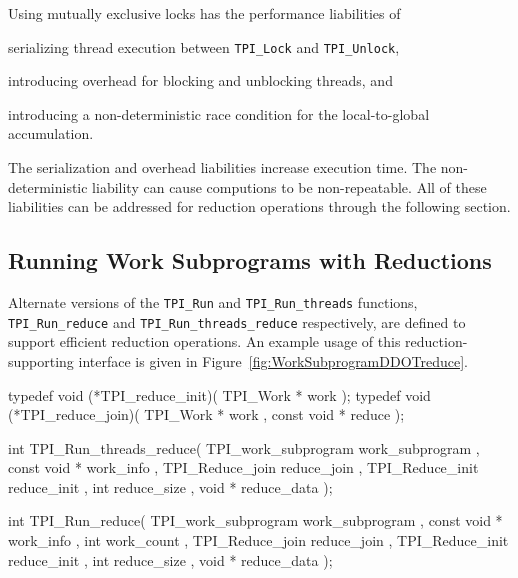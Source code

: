 Using mutually exclusive locks has the performance liabilities of 
\begin{blist}
\item serializing thread execution between \texttt{TPI\_Lock} and \texttt{TPI\_Unlock},
\item introducing overhead for blocking and unblocking threads, and
\item introducing a non-deterministic race condition for the local-to-global accumulation.
\end{blist}
%
The serialization and overhead liabilities increase execution time.
%
The non-deterministic liability can cause computions to be non-repeatable.
%
All of these liabilities can be addressed for reduction operations through the following section.


\clearpage
\subsection{Running Work Subprograms with Reductions} \label{sec:WorkSubprogramWithReduce}

Alternate versions of the \texttt{TPI\_Run} and \texttt{TPI\_Run\_threads} functions,
\texttt{TPI\_Run\_reduce} and \texttt{TPI\_Run\_threads\_reduce} respectively,
are defined to support efficient reduction operations.
%
An example usage of this reduction-supporting interface is given in 
Figure~\ref{fig:WorkSubprogramDDOTreduce}.

\begin{center}
\small
\begin{boxedverbatim}
typedef void (*TPI_reduce_init)( TPI_Work * work );
typedef void (*TPI_reduce_join)( TPI_Work * work , const void * reduce );

int TPI_Run_threads_reduce( TPI_work_subprogram work_subprogram  ,
                            const void *        work_info ,
                            TPI_Reduce_join     reduce_join ,
                            TPI_Reduce_init     reduce_init ,
                            int                 reduce_size ,
                            void *              reduce_data );

int TPI_Run_reduce( TPI_work_subprogram work_subprogram  ,
                    const void *        work_info ,
                    int                 work_count  ,
                    TPI_Reduce_join     reduce_join ,
                    TPI_Reduce_init     reduce_init ,
                    int                 reduce_size ,
                    void *              reduce_data );
\end{boxedverbatim}
\end{center}

